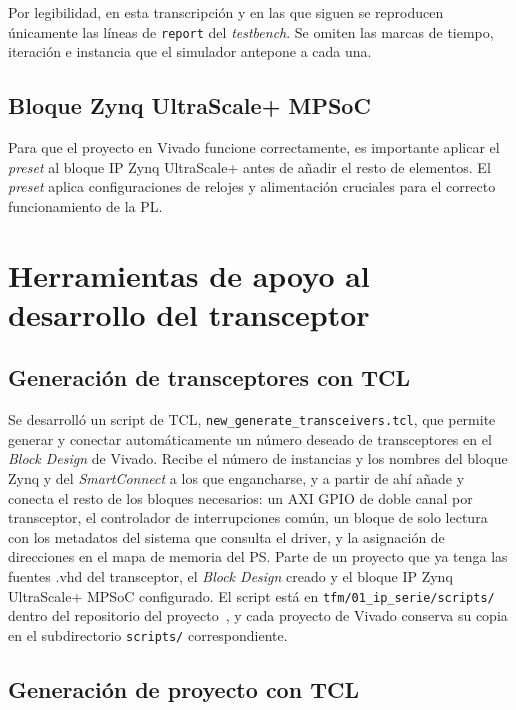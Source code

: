 Por legibilidad, en esta transcripción y en las que siguen se reproducen únicamente las líneas de
\texttt{report} del \textit{testbench}. Se omiten las marcas de tiempo, iteración e instancia que
el simulador antepone a cada una.

\subsection{Bloque Zynq UltraScale+ MPSoC}

Para que el proyecto en Vivado funcione correctamente, es importante aplicar el \textit{preset} al
bloque IP Zynq UltraScale+ antes de añadir el resto de elementos. El \textit{preset} aplica
configuraciones de relojes y alimentación cruciales para el correcto funcionamiento de la PL.

\section{Herramientas de apoyo al desarrollo del transceptor}

\subsection{Generación de transceptores con TCL}

Se desarrolló un script de TCL, \texttt{new\_generate\_transceivers.tcl}, que permite generar y
conectar automáticamente un número deseado de transceptores en el \textit{Block Design} de Vivado.
Recibe el número de instancias y los nombres del bloque Zynq y del \textit{SmartConnect} a los que
engancharse, y a partir de ahí añade y conecta el resto de los bloques necesarios: un AXI GPIO de
doble canal por transceptor, el controlador de interrupciones común, un bloque de solo lectura con
los metadatos del sistema que consulta el driver, y la asignación de direcciones en el mapa de
memoria del PS. Parte de un proyecto que ya tenga las fuentes .vhd del transceptor, el
\textit{Block Design} creado y el bloque IP Zynq UltraScale+ MPSoC configurado. El script está en
\texttt{tfm/01\_ip\_serie/scripts/} dentro del repositorio del proyecto~\cite{repo_tfm}, y cada
proyecto de Vivado conserva su copia en el subdirectorio \texttt{scripts/} correspondiente.

\subsection{Generación de proyecto con TCL}

